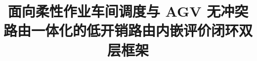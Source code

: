 \documentclass[manuscript,screen,review]{acmart}
\newcommand{\NCases}{10}
\newcommand{\GainLoopRule}{18.86\%}      %
\newcommand{\GainProbeLoop}{2.45\%}      %
\newcommand{\CellsSigLoopAdj}{9}
\newcommand{\GainPrune}{5.60\%}
\newcommand{\WinPrune}{50}
\newcommand{\LosePrune}{0}
\begin{document}
\title[低开销的路由内嵌评价闭环调度]{面向柔性作业车间调度与 AGV 无冲突路由一体化的低开销路由内嵌评价闭环双层框架}
\end{document}
